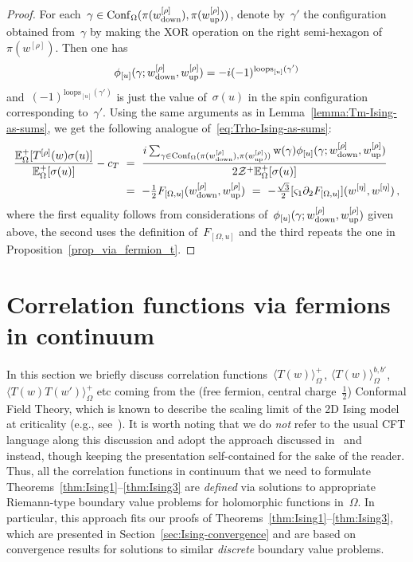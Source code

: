\documentclass[reqno,11pt,a4paper]{amsart}
\theoremstyle{remark}
\newcommand{\loopsU}{\mathrm{loops}_{[u]}}
\newcommand{\CmT}{c_T}
\newcommand{\Trho}{T^{[\rho]}}
\newcommand{\dob}{{b,b'}}
\newcommand{\E}{\mathbb{E}_\Omega}
\newcommand{\OmegaU}{{[\Omega,u]}}
\newcommand{\weta}{w^{\left[\eta \right]}}
\newcommand{\wrho}{w^{\left[\rho \right]}}
\newcommand{\wup}{\weta_{\vphantom{\mathrm{d}}\mathrm{up}}}
\renewcommand{\wup}{\wrho_{\vphantom{\mathrm{d}}\mathrm{up}}}
\newcommand{\wdown}{\weta_{\mathrm{down}}}
\renewcommand{\wdown}{\wrho_{\mathrm{down}}}
\newcommand{\wind}{\mathrm{wind}}
\newcommand{\phaseU}{\phi_{[u]}}
\newcommand{\weight}{\mathrm{w}}
\newcommand{\FU}{F_\OmegaU}     \newcommand{\FdeltaU}{F_{[\Omega_\delta,u_\delta]}}
\newcommand{\conf}{\mathrm{Conf}}
\newcommand{\dTwo}{\partial_2}
\newcommand{\sOne}{\varsigma_1}
\newcommand{\gammaxor}{\gamma_{\textrm{XOR}}}
\newcommand\Corr[1]{\langle #1 \rangle}
\newcommand\CorrO[2][+]{\Corr{#2}_\Omega^{#1}}
\newcommand\ConfO[1]{\conf_\Omega(#1)}
\def\cZ{\mathcal Z}
\begin{document}
\begin{proof}
For each~$\gamma \in \ConfO{\pi(\wdown),\pi(\wup)}$, denote by~$\gamma'$ the
configuration obtained from~$\gamma$ by making the XOR operation on the right semi-hexagon of~$\pi(\wrho)$.
Then one has
\begin{align*}
\phaseU (\gamma;\wdown,\wup) = -i(-1)^{\loopsU(\gamma')}
\end{align*}
and~$(-1)^{\loopsU(\gamma')}$ is just the value of~$\sigma(u)$ in the spin configuration corresponding to~$\gamma'$.
Using the same arguments as in Lemma~\ref{lemma:Tm-Ising-as-sums},
we get the following analogue of~\eqref{eq:Trho-Ising-as-sums}:
\begin{align*}
\frac{\E^+[\Trho(w)\sigma(u)]}{\E^+[\sigma(u)]} - \CmT
&~=~ \frac{i\sum_{\gamma\in \ConfO{\pi(\wdown),\pi(\wup)}}{\weight(\gamma)\phaseU (\gamma;\wdown,\wup)}}{2\cZ^+\E^+[\sigma(u)]}\\
&~=~ -\tfrac{1}{2}\FU(\wdown,\wup) ~=~ -{\textstyle\frac{\sqrt{3}}{2}}[\sOne\dTwo\FU](\weta,\weta)\,,
\end{align*}
where the first equality follows from considerations of~$\phaseU (\gamma;\wdown,\wup)$ given above,
the second uses the definition of~$\FU$ and the third repeats the one in Proposition~\ref{prop_via_fermion_t}.
\end{proof}

\setcounter{equation}{0}
\section{Correlation functions via fermions in continuum} \label{sec:CFT-correlations}

In this section we briefly discuss correlation functions~$\CorrO{T(w)}$\,, $\CorrO[\dob]{T(w)}$,~$\CorrO{T(w)T(w')}$ etc coming from the (free fermion, central charge~$\frac{1}{2}$) Conformal Field Theory, which is known to describe the scaling limit of the 2D Ising model at criticality (e.g., see~\cite[Sec. 14.2]{Mus10}). It is worth noting that we do \emph{not} refer to the usual CFT language along this discussion and adopt the approach discussed in~\cite[Section~4]{Che18} and~\cite{CheHonIzy21} instead, though keeping the presentation self-contained for the sake of the reader. Thus, all the correlation functions in continuum that we need to formulate Theorems~\mbox{\ref{thm:Ising1}--\ref{thm:Ising3}} are \emph{defined} via solutions to appropriate Riemann-type boundary value problems for holomorphic functions in~$\Omega$. In particular, this approach fits our proofs of Theorems~\mbox{\ref{thm:Ising1}--\ref{thm:Ising3}}, which are presented in Section~\ref{sec:Ising-convergence} and are based on convergence results for solutions to similar \emph{discrete} boundary value problems.
\end{document}
